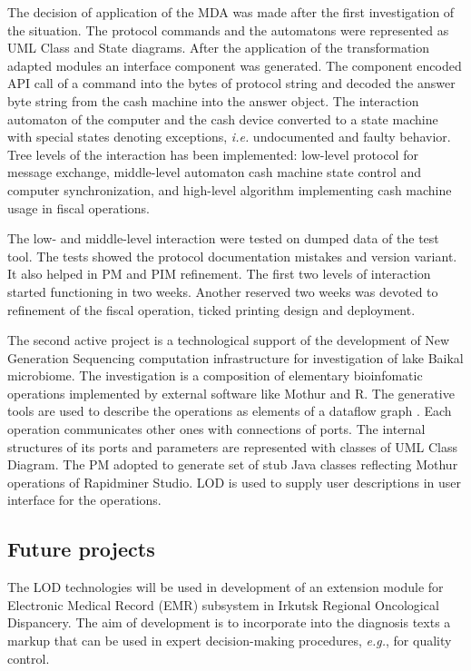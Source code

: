 \documentclass[runningheads]{llncs}
\begin{document}
The decision of application of the MDA was made after the first investigation of the situation.  The protocol commands and the automatons were represented as UML Class and State diagrams.  After the application of the transformation adapted modules an interface component was generated.  The component encoded API call of a command into the bytes of protocol string and decoded the answer byte string from the cash machine into the answer object.  The interaction automaton of the computer and the cash device converted to a state machine with special states denoting exceptions, \emph{i.e.} undocumented and faulty behavior.  Tree levels of the interaction has been implemented: low-level protocol for message exchange, middle-level automaton cash machine state control and computer synchronization, and high-level algorithm implementing cash machine usage in fiscal operations.

The low- and middle-level interaction were tested on dumped data of the test tool.  The tests showed the protocol documentation mistakes and version variant.  It also helped in PM and PIM refinement.  The first two levels of interaction started functioning in two weeks.  Another reserved two weeks was devoted to refinement of the fiscal operation, ticked printing design and deployment.

The second active project is a technological support of the development of New Generation Sequencing computation infrastructure for investigation of lake Baikal microbiome.  The investigation is a composition of elementary bioinfomatic operations implemented by external software like Mothur and R.  The generative tools are used to describe the operations as elements of a dataflow graph \cite{dataflow}.  Each operation communicates other ones with connections of ports.  The internal structures of its ports and parameters are represented with classes of UML Class Diagram.  The PM adopted to generate set of stub Java classes reflecting Mothur operations of Rapidminer Studio.  LOD is used to supply user descriptions in user interface for the operations.

\subsection{Future projects}
\label{sec:futuretargets}

The LOD technologies will be used in development of an extension module for Electronic Medical Record (EMR) subsystem in Irkutsk Regional Oncological Dispancery.  The aim of development is to incorporate into the diagnosis texts a markup that can be used in expert decision-making procedures, \emph{e.g.}, for quality control.
\end{document}
